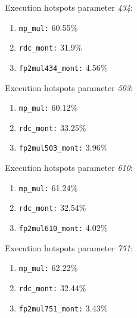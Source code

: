 Execution hotspots parameter \textit{434}:
\begin{enumerate}[noitemsep]
	\item \texttt{mp\_mul:} 60.55\%
	\item \texttt{rdc\_mont:} 31.9\%
	\item \texttt{fp2mul434\_mont:} 4.56\%
\end{enumerate}
Execution hotspots parameter \textit{503}:
\begin{enumerate}[noitemsep]
	\item \texttt{mp\_mul:} 60.12\%
	\item \texttt{rdc\_mont:} 33.25\%
	\item \texttt{fp2mul503\_mont:} 3.96\%
\end{enumerate}
Execution hotspots parameter \textit{610}:
\begin{enumerate}[noitemsep]
	\item \texttt{mp\_mul:} 61.24\%
	\item \texttt{rdc\_mont:} 32.54\%
	\item \texttt{fp2mul610\_mont:} 4.02\%
\end{enumerate}
Execution hotspots parameter \textit{751}:
\begin{enumerate}[noitemsep]
	\item \texttt{mp\_mul:} 62.22\%
	\item \texttt{rdc\_mont:} 32.44\%
	\item \texttt{fp2mul751\_mont:} 3.43\%
\end{enumerate}
